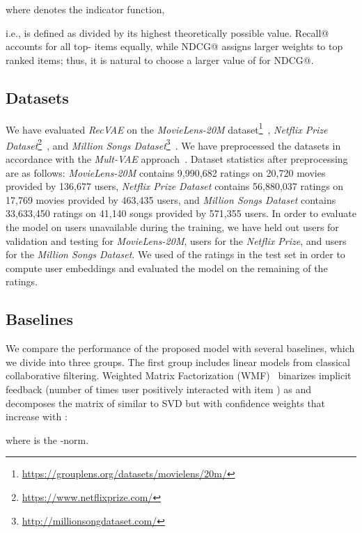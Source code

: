 \documentclass[sigconf,authorversion]{acmart}
\begin{document}
where  denotes the indicator function,


i.e.,  is defined as  divided by its highest theoretically possible value.
Recall@ accounts for all top- items equally, while NDCG@ assigns larger weights to top ranked items; thus, it is natural to choose a larger value of  for NDCG@.


\subsection{Datasets}

We have evaluated \emph{RecVAE} on the \emph{MovieLens-20M} dataset\footnote{\url{https://grouplens.org/datasets/movielens/20m/}}~\cite{MovieLens}, \emph{Netflix Prize Dataset}\footnote{\url{https://www.netflixprize.com/}}~\cite{netflix}, and \emph{Million Songs Dataset}\footnote{\url{http://millionsongdataset.com/}}~\cite{songdata}.
We have preprocessed the datasets in accordance with the \emph{Mult-VAE} approach~\cite{liang2018variational}.
Dataset statistics after preprocessing are as follows:
\emph{MovieLens-20M} contains 9{,}990{,}682 ratings on 20{,}720 movies provided by 136{,}677 users,
\emph{Netflix Prize Dataset} contains 56{,}880{,}037 ratings on 17{,}769 movies provided by 463{,}435 users, and
\emph{Million Songs Dataset} contains 33{,}633{,}450  ratings on 41{,}140 songs provided by 571{,}355 users. 
In order to evaluate the model on users unavailable during the training, we have held out  users for validation and testing for \emph{MovieLens-20M},  users for the \emph{Netflix Prize}, and  users for the \emph{Million Songs Dataset}. We used  of the ratings in the test set in order to compute user embeddings and evaluated the model on the remaining  of the ratings.


  
\subsection{Baselines}\label{sec:baselines}

We compare the performance of the proposed model with several baselines, which we divide into three groups. 
The first group includes linear models from classical collaborative filtering. Weighted Matrix Factorization (WMF)~\cite{hu2008collaborative} binarizes implicit feedback  (number of times user  positively interacted with item ) as  and decomposes the matrix of  similar to SVD but with confidence weights that increase with :

where  is the -norm.
\end{document}
